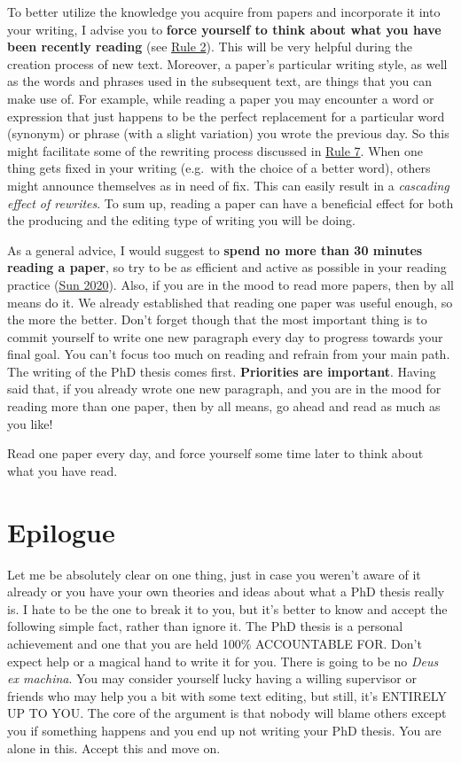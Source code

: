 \documentclass[
  12pt,
  oneside]{book}
\begin{document}
To better utilize the knowledge you acquire from papers and incorporate it into your writing, I advise you to \textbf{force yourself to think about what you have been recently reading} (see \protect\hyperlink{rule2}{Rule 2}).
This will be very helpful during the creation process of new text.
Moreover, a paper's particular writing style, as well as the words and phrases used in the subsequent text, are things that you can make use of.
For example, while reading a paper you may encounter a word or expression that just happens to be the perfect replacement for a particular word (synonym) or phrase (with a slight variation) you wrote the previous day.
So this might facilitate some of the rewriting process discussed in \protect\hyperlink{rule7}{Rule 7}.
When one thing gets fixed in your writing (e.g.~with the choice of a better word), others might announce themselves as in need of fix.
This can easily result in a \emph{cascading effect of rewrites}.
To sum up, reading a paper can have a beneficial effect for both the producing and the editing type of writing you will be doing.

As a general advice, I would suggest to \textbf{spend no more than 30 minutes reading a paper}, so try to be as efficient and active as possible in your reading practice (\protect\hyperlink{ref-Sun2020}{Sun 2020}).
Also, if you are in the mood to read more papers, then by all means do it.
We already established that reading one paper was useful enough, so the more the better.
Don't forget though that the most important thing is to commit yourself to write one new paragraph every day to progress towards your final goal.
You can't focus too much on reading and refrain from your main path.
The writing of the PhD thesis comes first.
\textbf{Priorities are important}.
Having said that, if you already wrote one new paragraph, and you are in the mood for reading more than one paper, then by all means, go ahead and read as much as you like!

Read one paper every day, and force yourself some time later to think about what you have read.

\hypertarget{epilogue}{%
\chapter*{Epilogue}\label{epilogue}}

Let me be absolutely clear on one thing, just in case you weren't aware of it already or you have your own theories and ideas about what a PhD thesis really is.
I hate to be the one to break it to you, but it's better to know and accept the following simple fact, rather than ignore it.
The PhD thesis is a personal achievement and one that you are held 100\% ACCOUNTABLE FOR.
Don't expect help or a magical hand to write it for you.
There is going to be no \emph{Deus ex machina}.
You may consider yourself lucky having a willing supervisor or friends who may help you a bit with some text editing, but still, it's ENTIRELY UP TO YOU.
The core of the argument is that nobody will blame others except you if something happens and you end up not writing your PhD thesis.
You are alone in this.
Accept this and move on.
\end{document}
